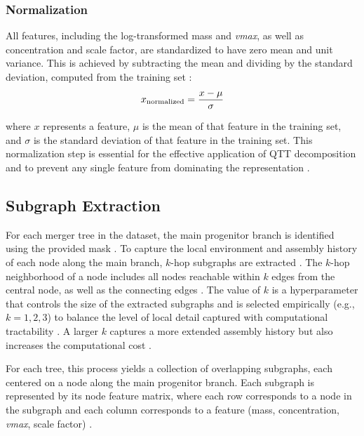 \documentclass[twocolumn]{aastex631}
\begin{document}
\subsubsection{Normalization}
All features, including the log-transformed mass and \textit{vmax}, as well as concentration and scale factor, are standardized to have zero mean and unit variance. This is achieved by subtracting the mean and dividing by the standard deviation, computed from the training set \citep{coughlin2020standardizingkilonovaeusestandard}:
\begin{equation}
x_{\rm{normalized}} = \frac{x - \mu}{\sigma} 
\end{equation}
\citep{rouhiainen2021normalizingflowsrandomfields,crenshaw2024probabilisticforwardmodelinggalaxy,yan2025denoisingmilkywaystellar}

where \(x\) represents a feature, \(\mu\) is the mean of that feature in the training set, and \(\sigma\) is the standard deviation of that feature in the training set. This normalization step is essential for the effective application of QTT decomposition and to prevent any single feature from dominating the representation \citep{rouhiainen2021normalizingflowsrandomfields,hassan2022hiflowgeneratingdiversehi,lovell2023hierarchynormalizingflowsmodelling}.

\subsection{Subgraph Extraction}
For each merger tree in the dataset, the main progenitor branch is identified using the provided mask \citep{elahi2019climbinghalomergertrees}. To capture the local environment and assembly history of each node along the main branch, \(k\)-hop subgraphs are extracted \citep{jespersen2022textttmangrovelearninggalaxyproperties}. The \(k\)-hop neighborhood of a node includes all nodes reachable within \(k\) edges from the central node, as well as the connecting edges \citep{jespersen2022textttmangrovelearninggalaxyproperties}. The value of \(k\) is a hyperparameter that controls the size of the extracted subgraphs and is selected empirically (e.g., \(k = 1, 2, 3\)) to balance the level of local detail captured with computational tractability \citep{jespersen2022textttmangrovelearninggalaxyproperties}. A larger \(k\) captures a more extended assembly history but also increases the computational cost \citep{jespersen2022textttmangrovelearninggalaxyproperties}.

For each tree, this process yields a collection of overlapping subgraphs, each centered on a node along the main progenitor branch. Each subgraph is represented by its node feature matrix, where each row corresponds to a node in the subgraph and each column corresponds to a feature (mass, concentration, \textit{vmax}, scale factor) \citep{ji2024graphicalmultifidelitygaussianprocess}.
\end{document}
